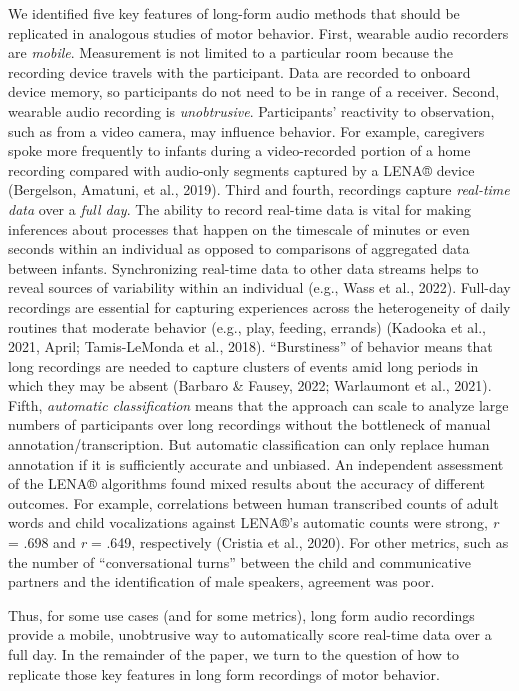 \documentclass[
  man]{apa6}
\begin{document}
We identified five key features of long-form audio methods that should be replicated in analogous studies of motor behavior. First, wearable audio recorders are \emph{mobile}. Measurement is not limited to a particular room because the recording device travels with the participant. Data are recorded to onboard device memory, so participants do not need to be in range of a receiver. Second, wearable audio recording is \emph{unobtrusive}. Participants' reactivity to observation, such as from a video camera, may influence behavior. For example, caregivers spoke more frequently to infants during a video-recorded portion of a home recording compared with audio-only segments captured by a LENA® device (Bergelson, Amatuni, et al., 2019). Third and fourth, recordings capture \emph{real-time data} over a \emph{full day}. The ability to record real-time data is vital for making inferences about processes that happen on the timescale of minutes or even seconds within an individual as opposed to comparisons of aggregated data between infants. Synchronizing real-time data to other data streams helps to reveal sources of variability within an individual (e.g., Wass et al., 2022). Full-day recordings are essential for capturing experiences across the heterogeneity of daily routines that moderate behavior (e.g., play, feeding, errands) (Kadooka et al., 2021, April; Tamis-LeMonda et al., 2018). ``Burstiness'' of behavior means that long recordings are needed to capture clusters of events amid long periods in which they may be absent (Barbaro \& Fausey, 2022; Warlaumont et al., 2021). Fifth, \emph{automatic classification} means that the approach can scale to analyze large numbers of participants over long recordings without the bottleneck of manual annotation/transcription. But automatic classification can only replace human annotation if it is sufficiently accurate and unbiased. An independent assessment of the LENA® algorithms found mixed results about the accuracy of different outcomes. For example, correlations between human transcribed counts of adult words and child vocalizations against LENA®'s automatic counts were strong, \emph{r} = .698 and \emph{r} = .649, respectively (Cristia et al., 2020). For other metrics, such as the number of ``conversational turns'' between the child and communicative partners and the identification of male speakers, agreement was poor.

Thus, for some use cases (and for some metrics), long form audio recordings provide a mobile, unobtrusive way to automatically score real-time data over a full day. In the remainder of the paper, we turn to the question of how to replicate those key features in long form recordings of motor behavior.
\end{document}
